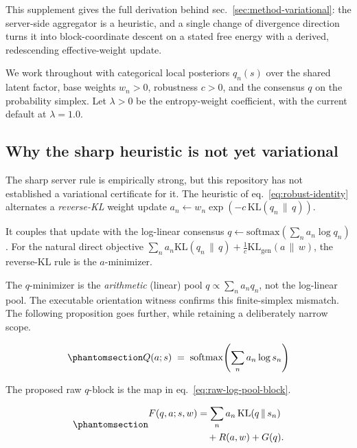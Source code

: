 \documentclass[
  english,
]{article}
\theoremstyle{plain}
\theoremstyle{definition}
\theoremstyle{remark}
\theoremstyle{definition}
\begin{document}
This supplement gives the full derivation behind
sec.~\ref{sec:method-variational}: the server-side aggregator
 is a heuristic, and a single change of
divergence direction turns it into block-coordinate descent on a stated
free energy with a derived, redescending effective-weight update.

We work throughout with categorical local posteriors \(q_n(s)\) over the
shared latent factor, base weights \(w_n > 0\), robustness \(c > 0\),
and the consensus \(q\) on the probability simplex. Let \(\lambda>0\) be
the entropy-weight coefficient, with the current default at
\(\lambda=1.0\).

\subsection{Why the sharp heuristic is not yet
variational}\label{sec:supp-why-heuristic}

The sharp server rule is empirically strong, but this repository has not
established a variational certificate for it. The heuristic of
eq.~\ref{eq:robust-identity} alternates a \emph{reverse-KL} weight
update \(a_n \leftarrow w_n\exp(-c\,\mathrm{KL}(q_n \,\|\, q))\).

It couples that update with the log-linear consensus
\(q \leftarrow \mathrm{softmax}(\sum_n a_n \log q_n)\). For the natural
direct objective \(\sum_n a_n \mathrm{KL}(q_n \,\|\, q) +
\tfrac{1}{c}\mathrm{KL_{gen}}(a\,\|\,w)\), the reverse-KL rule is the
\(a\)-minimizer.

The \(q\)-minimizer is the \emph{arithmetic} (linear) pool
\(q \propto \sum_n a_n q_n\), not the log-linear pool. The executable
orientation witness confirms this finite-simplex mismatch. The following
proposition goes further, while retaining a deliberately narrow scope.

\begin{equation}\protect\phantomsection\label{eq:raw-log-pool-block}{Q(a;s) \;=\; \operatorname{softmax}\!\left(\sum_n a_n\log s_n\right)}\end{equation}

The proposed raw \(q\)-block is the map in
eq.~\ref{eq:raw-log-pool-block}.

\begin{equation}\protect\phantomsection\label{eq:separable-server-objective}{\begin{aligned}
F(q,a;s,w)
&= \sum_n a_n\,\mathrm{KL}(q\,\|\,s_n)\\
&\quad + R(a,w) + G(q).
\end{aligned}}\end{equation}
\end{document}
